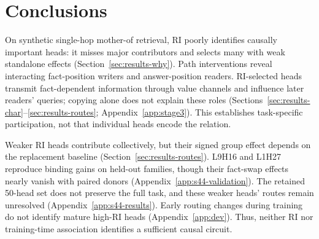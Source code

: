 \section{Conclusions}
\label{sec:conclusions}

On synthetic single-hop mother-of retrieval, RI poorly identifies causally
important heads: it misses major contributors and selects many with weak
standalone effects (Section~\ref{sec:results-why}). Path interventions reveal
interacting fact-position writers and answer-position readers. RI-selected
heads transmit fact-dependent information through value channels and influence
later readers' queries; copying alone does not explain these roles
(Sections~\ref{sec:results-char}--\ref{sec:results-routes};
Appendix~\ref{app:stage3}). This establishes task-specific participation,
not that individual heads encode the relation.

Weaker RI heads contribute collectively, but their signed group effect
depends on the replacement baseline (Section~\ref{sec:results-routes}).
L9H16 and L1H27 reproduce binding gains on held-out families, though their
fact-swap effects nearly vanish with paired donors
(Appendix~\ref{app:s44-validation}). The retained 50-head set does not
preserve the full task, and these weaker heads' routes remain unresolved
(Appendix~\ref{app:s44-results}). Early routing changes during training do
not identify mature high-RI heads (Appendix~\ref{app:dev}). Thus, neither RI
nor training-time association identifies a sufficient causal circuit.
